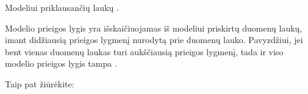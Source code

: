 \documentclass[letterpaper,10pt,lithuanian]{sphinxmanual}
\begin{document}
\begin{fulllineitems}
\label{\detokenize{dimensijos:model.access}}
\pysigstartsignatures
\pysigline
{}
\pysigstopsignatures
\sphinxAtStartPar
Modeliui priklausančių laukų {\hyperref[\detokenize{prieiga:access}]{}}.

\sphinxAtStartPar
Modelio prieigos lygis yra išskaičiuojamas iš modeliui priskirtų duomenų laukų, imant didžiausią prieigos lygmenį nurodytą prie duomenų lauko. Pavyzdžiui, jei bent vienas duomenų laukas turi aukščiausią  prieigos lygmenį, tada ir viso modelio prieigos lygis tampa .


\begin{sphinxseealso}{Taip pat žiūrėkite:}

\sphinxAtStartPar
{\hyperref[\detokenize{prieiga:access}]{}}


\end{sphinxseealso}


\end{fulllineitems}

\end{document}

